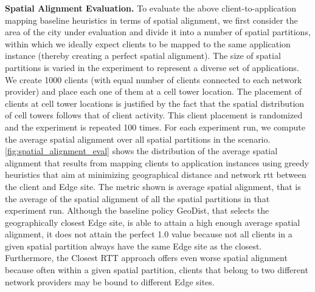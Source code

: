 \par \noindent \textbf{Spatial Alignment Evaluation. }To evaluate the above client-to-application mapping baseline heuristics in terms of spatial alignment, we first consider the area of the city under evaluation and divide it into a number of spatial partitions, within which we ideally expect clients to be mapped to the same application instance (thereby creating a perfect spatial alignment). The size of spatial partitions is varied in the experiment to represent a diverse set of applications. We create 1000 clients (with equal number of clients connected to each network provider) and place each one of them at a cell tower location. The placement of clients at cell tower locations is justified by the fact that the spatial distribution of cell towers follows that of client activity. This client placement is randomized and the experiment is repeated 100 times. For each experiment run, we compute the average spatial alignment over all spatial partitions in the scenario. \cref{fig:spatial_alignment_eval} shows the distribution of the average spatial alignment that results from mapping clients to application instances using greedy heuristics that aim at minimizing geographical distance and network \gls{rtt} between the client and Edge site. The metric shown is average spatial alignment, that is the average of the spatial alignment of all the spatial partitions in that experiment run. Although the baseline policy GeoDist, that selects the geographically closest Edge site, is able to attain a high enough average spatial alignment, it does not attain the perfect 1.0 value because not all clients in a given spatial partition always have the same Edge site as the closest. Furthermore, the Closest RTT approach offers even worse spatial alignment because often within a given spatial partition, clients that belong to two different network providers may be bound to different Edge sites. 

